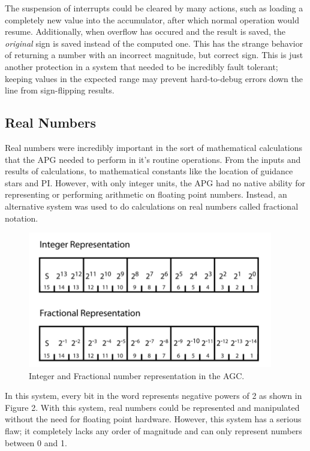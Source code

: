 \documentclass[a4paper,11pt]{article}
\begin{document}
The suspension of interrupts could be cleared by many actions, such as loading a completely new value into the accumulator, after which normal operation would resume.  Additionally, when overflow has occured and the result is saved, the {\it original} sign is saved instead of the computed one.  This has the strange behavior of returning a number with an incorrect magnitude, but correct sign.  This is just another protection in a system that needed to be incredibly fault tolerant; keeping values in the expected range may prevent hard-to-debug errors down the line from sign-flipping results.

\subsection{Real Numbers}
Real numbers were incredibly important in the sort of mathematical calculations that the APG needed to perform in it's routine operations.  From the inputs and results of calculations, to mathematical constants like the location of guidance stars and PI.  However, with only integer units, the APG had no native ability for representing or performing arithmetic on floating point numbers.   Instead, an alternative system was used to do calculations on real numbers called fractional notation.

\begin{figure}[h!]
\caption{Integer and Fractional number representation in the AGC.} 
\centering
\includegraphics[width=.8\textwidth]{apg_numbers.png} 
\end{figure}
\vspace{0.02cm}

In this system, every bit in the word represents negative powers of 2 as shown in Figure 2.  With this system, real numbers could be represented and manipulated without the need for floating point hardware.  However, this system has a serious flaw; it completely lacks any order of magnitude and can only represent numbers between 0 and 1.
\end{document}
